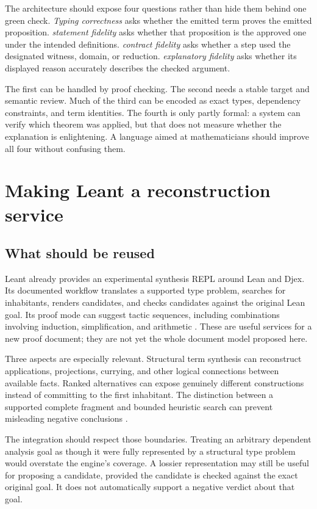 \documentclass[11pt,letterpaper]{article}
\theoremstyle{remark}
\begin{document}
The architecture should expose four questions rather than hide them behind one green check. \emph{Typing correctness} asks whether the emitted term proves the emitted proposition. \emph{statement fidelity} asks whether that proposition is the approved one under the intended definitions. \emph{contract fidelity} asks whether a step used the designated witness, domain, or reduction. \emph{explanatory fidelity} asks whether its displayed reason accurately describes the checked argument.

The first can be handled by proof checking. The second needs a stable target and semantic review. Much of the third can be encoded as exact types, dependency constraints, and term identities. The fourth is only partly formal: a system can verify which theorem was applied, but that does not measure whether the explanation is enlightening. A language aimed at mathematicians should improve all four without confusing them.

\section{Making Leant a reconstruction service}
\label{sec:leant}

\subsection{What should be reused}

Leant already provides an experimental synthesis REPL around Lean and Djex. Its documented workflow translates a supported type problem, searches for inhabitants, renders candidates, and checks candidates against the original Lean goal. Its proof mode can suggest tactic sequences, including combinations involving induction, simplification, and arithmetic \cite{leant-readme}. These are useful services for a new proof document; they are not yet the whole document model proposed here.

Three aspects are especially relevant. Structural term synthesis can reconstruct applications, projections, currying, and other logical connections between available facts. Ranked alternatives can expose genuinely different constructions instead of committing to the first inhabitant. The distinction between a supported complete fragment and bounded heuristic search can prevent misleading negative conclusions \cite{leant-readme,leant-internals}.

The integration should respect those boundaries. Treating an arbitrary dependent analysis goal as though it were fully represented by a structural type problem would overstate the engine's coverage. A lossier representation may still be useful for proposing a candidate, provided the candidate is checked against the exact original goal. It does not automatically support a negative verdict about that goal.
\end{document}

